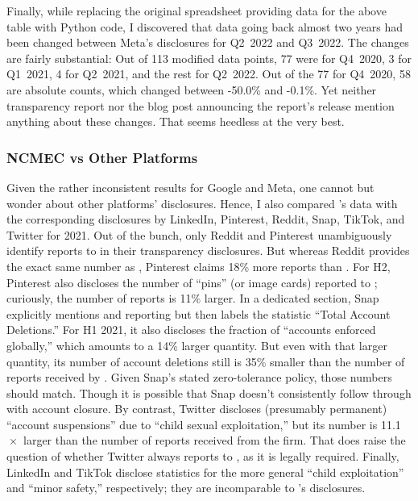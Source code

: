 Finally, while replacing the original spreadsheet providing data for the above
table with Python code, I discovered that data going back almost two years had
been changed between Meta's disclosures for Q2~2022 and Q3~2022. The changes are
fairly substantial: Out of 113 modified data points, 77 were for Q4~2020, 3 for
Q1~2021, 4 for Q2~2021, and the rest for Q2~2022. Out of the 77 for Q4~2020, 58
are absolute counts, which changed between -50.0\% and -0.1\%. Yet neither
transparency report nor the blog post announcing the report's release mention
anything about these changes. That seems heedless at the very best.


\subsubsection{NCMEC vs Other Platforms}

Given the rather inconsistent results for Google and Meta, one cannot but wonder
about other platforms' disclosures. Hence, I also compared 's data with
the corresponding disclosures by LinkedIn, Pinterest, Reddit, Snap, TikTok, and
Twitter for 2021. Out of the bunch, only Reddit and Pinterest unambiguously
identify  reports to  in their transparency disclosures. But
whereas Reddit provides the exact same number as , Pinterest claims 18\%
more reports than . For H2, Pinterest also discloses the number of
``pins'' (or image cards) reported to ; curiously, the number of reports
is 11\% larger. In a dedicated section, Snap explicitly mentions  and
 reporting but then labels the statistic ``Total Account Deletions.'' For
H1 2021, it also discloses the fraction of ``accounts enforced globally,'' which
amounts to a 14\% larger quantity. But even with that larger quantity, its
number of account deletions still is 35\% smaller than the number of reports
received by . Given Snap's stated zero-tolerance policy, those numbers
should match. Though it is possible that Snap doesn't consistently follow
through with account closure. By contrast, Twitter discloses (presumably
permanent) ``account suspensions'' due to ``child sexual exploitation,'' but its
number is 11.1$\mspace{1mu}\times$ larger than the number of reports 
received from the firm. That does raise the question of whether Twitter always
reports  to , as it is legally required. Finally, LinkedIn and
TikTok disclose statistics for the more general ``child exploitation'' and
``minor safety,'' respectively; they are incomparable to 's disclosures.

